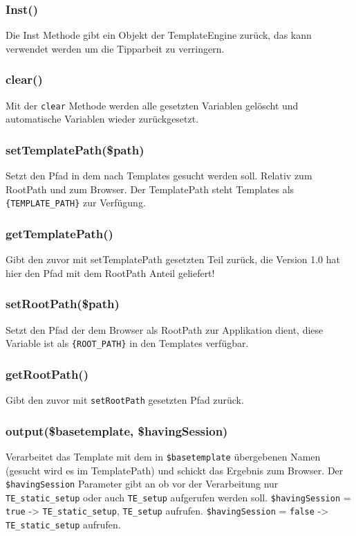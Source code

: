 \documentclass[a4paper,10pt]{article}
\begin{document}
\subsubsection{Inst()}
Die Inst Methode gibt ein Objekt der TemplateEngine zur\"uck, das kann verwendet werden um die Tipparbeit zu verringern.

\subsubsection{clear()}
Mit der {\tt clear} Methode werden alle gesetzten Variablen gel\"oscht und automatische Variablen wieder zur\"uckgesetzt.

\subsubsection{setTemplatePath(\$path)}
Setzt den Pfad in dem nach Templates gesucht werden soll. Relativ zum RootPath und zum Browser.
Der TemplatePath steht Templates als {\tt \{TEMPLATE\_PATH\}} zur Verf\"ugung.

\subsubsection{getTemplatePath()}
Gibt den zuvor mit setTemplatePath gesetzten Teil zur\"uck, die Version 1.0 hat hier den Pfad mit dem RootPath Anteil geliefert!

\subsubsection{setRootPath(\$path)}
Setzt den Pfad der dem Browser als RootPath zur Applikation dient, diese Variable ist als {\tt \{ROOT\_PATH\}} in den Templates verf\"ugbar.

\subsubsection{getRootPath()}
Gibt den zuvor mit {\tt setRootPath} gesetzten Pfad zur\"uck.

\subsubsection{output(\$basetemplate, \$havingSession)}
Verarbeitet das Template mit dem in {\tt \$basetemplate} \"ubergebenen Namen (gesucht wird es im TemplatePath) und schickt das Ergebnis zum Browser.
Der {\tt \$havingSession} Parameter gibt an ob vor der Verarbeitung nur {\tt TE\_static\_setup} oder auch {\tt TE\_setup} aufgerufen werden soll.\newline
{\tt \$havingSession} = {\tt true} -{\textgreater} {\tt TE\_static\_setup}, {\tt TE\_setup} aufrufen.\newline
{\tt \$havingSession} = {\tt false} -{\textgreater} {\tt TE\_static\_setup} aufrufen.
\end{document}
